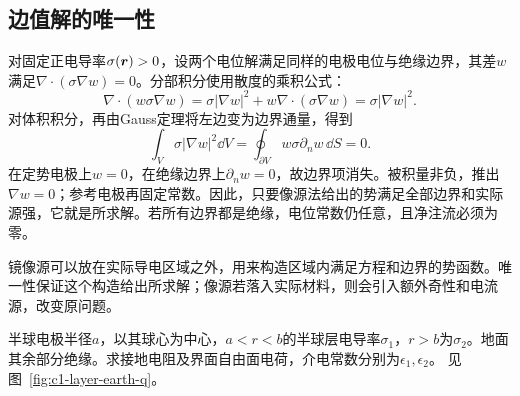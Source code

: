 \subsection{边值解的唯一性}
对固定正电导率$\sigma(\bm{r})>0$，设两个电位解满足同样的电极电位与绝缘边界，其差$w$满足$\nabla\cdot(\sigma\nabla w)=0$。分部积分使用散度的乘积公式：
\[\nabla\cdot(w\sigma\nabla w)
=\sigma|\nabla w|^2+w\nabla\cdot(\sigma\nabla w)
=\sigma|\nabla w|^2.\]
对体积积分，再由Gauss定理将左边变为边界通量，得到
\[
 \int_V\sigma|\nabla w|^2\dd V
 =\oint_{\partial V}w\sigma\partial_nw\,\dd S=0.
\]
在定势电极上$w=0$，在绝缘边界上$\partial_nw=0$，故边界项消失。被积量非负，推出$\nabla w=0$；参考电极再固定常数。因此，只要像源法给出的势满足全部边界和实际源强，它就是所求解。若所有边界都是绝缘，电位常数仍任意，且净注流必须为零。

镜像源可以放在实际导电区域之外，用来构造区域内满足方程和边界的势函数。唯一性保证这个构造给出所求解；像源若落入实际材料，则会引入额外奇性和电流源，改变原问题。

\begin{example}[两层大地中的径向电流]\label{ex:c1-layer-earth}
半球电极半径$a$，以其球心为中心，$a<r<b$的半球层电导率$\sigma_1$，$r>b$为$\sigma_2$。地面其余部分绝缘。求接地电阻及界面自由面电荷，介电常数分别为$\epsilon_1,\epsilon_2$。 见图~\ref{fig:c1-layer-earth-q}。
\end{example}

